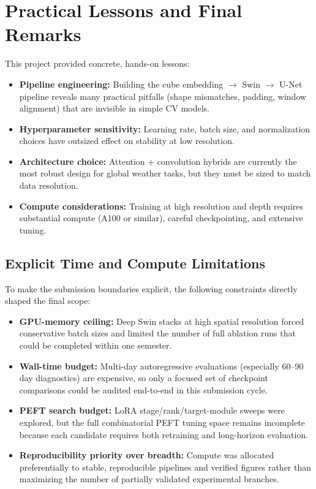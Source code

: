 \documentclass[12pt]{report}
\begin{document}
\chapter{Practical Lessons and Final Remarks}

This project provided concrete, hands-on lessons:

\begin{itemize}
  \item \textbf{Pipeline engineering:} Building the cube embedding $\rightarrow$ Swin $\rightarrow$ U-Net pipeline reveals many practical pitfalls (shape mismatches, padding, window alignment) that are invisible in simple CV models.
  \item \textbf{Hyperparameter sensitivity:} Learning rate, batch size, and normalization choices have outsized effect on stability at low resolution.
  \item \textbf{Architecture choice:} Attention + convolution hybrids are currently the most robust design for global weather tasks, but they must be sized to match data resolution.
  \item \textbf{Compute considerations:} Training at high resolution and depth requires substantial compute (A100 or similar), careful checkpointing, and extensive tuning.
\end{itemize}

\section{Explicit Time and Compute Limitations}

To make the submission boundaries explicit, the following constraints directly shaped the final scope:

\begin{itemize}
  \item \textbf{GPU-memory ceiling:} Deep Swin stacks at high spatial resolution forced conservative batch sizes and limited the number of full ablation runs that could be completed within one semester.
  \item \textbf{Wall-time budget:} Multi-day autoregressive evaluations (especially 60--90 day diagnostics) are expensive, so only a focused set of checkpoint comparisons could be audited end-to-end in this submission cycle.
  \item \textbf{PEFT search budget:} LoRA stage/rank/target-module sweeps were explored, but the full combinatorial PEFT tuning space remains incomplete because each candidate requires both retraining and long-horizon evaluation.
  \item \textbf{Reproducibility priority over breadth:} Compute was allocated preferentially to stable, reproducible pipelines and verified figures rather than maximizing the number of partially validated experimental branches.
\end{itemize}
\end{document}
